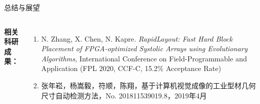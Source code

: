 \documentclass[10pt]{beamer}
\begin{document}
\begin{frame}{总结与展望}
\begin{columns}[T, onlytextwidth]
{    {\bf 相关科研成果：}
    }

    {\fontsize{6}{8}\selectfont
    \begin{enumerate}
      \item N. Zhang, X. Chen, N. Kapre.  {\it RapidLayout: Fast Hard Block Placement of FPGA-optimized Systolic Arrays using Evolutionary Algorithms}, International Conference on Field-Programmable and Application (FPL 2020, CCF-C, 15.2\% Acceptance Rate)
      \item 张年崧，杨嵩毅，符顺，陈翔，基于计算机视觉成像的工业型材几何尺寸自动检测方法，No. 201811539019.8，2019年4月
    \end{enumerate}

    }



\end{columns}
\end{frame}
\end{document}

